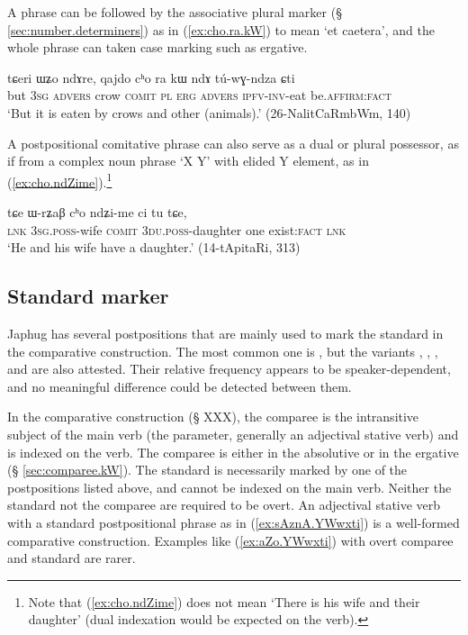 A  phrase can be followed by the associative plural marker  (§ \ref{sec:number.determiners}) as in (\ref{ex:cho.ra.kW}) to mean `et caetera', and the whole phrase can taken case marking such as ergative.

\begin{exe}
\ex \label{ex:cho.ra.kW}
\gll tɕeri ɯʑo ndɤre, qajdo cʰo ra kɯ ndɤ tú-wɣ-ndza ɕti \\
but \textsc{3sg} \textsc{advers} crow \textsc{comit} \textsc{pl} \textsc{erg} \textsc{advers} \textsc{ipfv}-\textsc{inv}-eat be.\textsc{affirm}:\textsc{fact} \\
\glt `But it is eaten by crows and other (animals).' (26-NalitCaRmbWm, 140)
\end{exe}

A postpositional comitative phrase can also serve as a dual or plural possessor, as if from a complex noun phrase `X  Y' with elided Y element, as in (\ref{ex:cho.ndZime}).\footnote{Note that (\ref{ex:cho.ndZime}) does not mean `There is his wife and their daughter' (dual indexation would be expected on the verb).}

\begin{exe}
\ex \label{ex:cho.ndZime}
\gll tɕe ɯ-rʑaβ cʰo ndʑi-me ci tu tɕe, \\
\textsc{lnk} \textsc{3sg}.\textsc{poss}-wife \textsc{comit} \textsc{3du}.\textsc{poss}-daughter one exist:\textsc{fact} \textsc{lnk} \\
\glt `He and his wife have a daughter.' (14-tApitaRi, 313)
\end{exe}

\subsection{Standard marker} \label{sec:comparative} 
Japhug has several postpositions that are mainly used to mark the standard in the comparative construction. The most common one is , but the variants , , ,  and  are also attested. Their relative frequency appears to be speaker-dependent, and no meaningful difference could be detected between them. 

In the comparative construction (§ XXX), the comparee is the intransitive subject of the main verb (the parameter, generally an adjectival stative verb) and is indexed on the verb. The comparee is either in the absolutive or in the ergative (§ \ref{sec:comparee.kW}). The standard is necessarily marked by one of the postpositions listed above, and cannot be indexed on the main verb. Neither the standard not the comparee are required to be overt. An adjectival stative verb with a standard postpositional phrase as in  (\ref{ex:sAznA.YWwxti})  is a well-formed comparative construction. Examples like (\ref{ex:aZo.YWwxti}) with overt comparee and standard are rarer.

